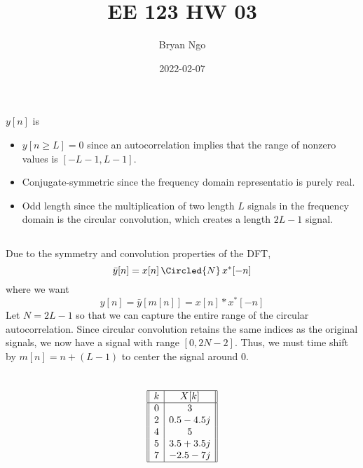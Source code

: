 \documentclass{article}
\title{EE 123 HW 03}
\author{Bryan Ngo}
\date{2022-02-07}
\begin{document}
\maketitle

\setcounter{section}{2}

\section{}

\subsection{}

\(y[n]\) is
\begin{itemize}
    \item \(y[n \geqslant L] = 0\) since an autocorrelation implies that the range of nonzero values is \([-L - 1, L - 1]\).
    \item Conjugate-symmetric since the frequency domain representatio is purely real.
    \item Odd length since the multiplication of two length \(L\) signals in the frequency domain is the circular convolution, which creates a length \(2L - 1\) signal.
\end{itemize}

\subsection{}

Due to the symmetry and convolution properties of the DFT,
\begin{equation}
    \bar{y}[n] = x[n] \, \Circled{N} \, x^\ast[-n]
\end{equation}
where we want
\begin{equation}
    y[n] = \bar{y}[m[n]] = x[n] \ast x^\ast[-n]
\end{equation}
Let \(N = 2L - 1\) so that we can capture the entire range of the circular autocorrelation.
Since circular convolution retains the same indices as the original signals, we now have a signal with range \([0, 2N - 2]\).
Thus, we must time shift by \(m[n] = n + (L - 1)\) to center the signal around 0.

\newpage
\section{}

\begin{equation}
    \begin{array}[]{||c|c||}
        \hline
        k & X[k] \\
        \hline
        0 & 3 \\
        2 & 0.5 - 4.5j \\
        4 & 5 \\
        5 & 3.5 + 3.5j \\
        7 & -2.5 - 7j \\
        \hline
    \end{array}
\end{equation}
\end{document}

